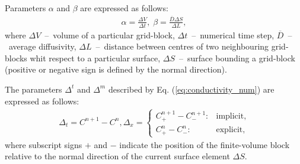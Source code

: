 \documentclass[a4paper,14pt,english]{extreport}
\begin{document}
Parameters $\alpha$ and $\beta$ are expressed as follows:
    \begin{eqnarray}
        \label{eq:alpha_beta}
        \alpha = \frac{\Delta V}{\Delta t}, \;
        \beta= \frac{\overline{D} \Delta S}{\Delta L},
    \end{eqnarray}
where $\Delta V$~--~volume of a particular grid-block, $\Delta t$~--~numerical time step, $\overline{D}$~--~average diffusivity, $\Delta L$~--~distance between centres of two neighbouring grid-blocks whit respect to a particular surface, $\Delta S$~--~surface bounding a grid-block (positive or negative sign is defined by the normal direction).

The parameters $\Delta^{t}$ and $\Delta^{m}$ described by Eq. (\ref{eq:conductivity_num}) are expressed as follows:
    \begin{eqnarray}
    \label{eq:delta_num}
    \Delta_t = C^{n+1} - C^{n}, \Delta_x = \begin{cases}
    C_{+}^{n+\mathit1} - C_{-}^{n+\mathit1} : &\text{implicit},\\
        C_{+}^{n} - C_{-}^{n} : &\text{explicit},
    \end{cases}
    \end{eqnarray}
where subscript signs $+$ and $-$ indicate the position of the finite-volume block relative to the normal direction of the current surface element $\Delta S$.
\end{document}
